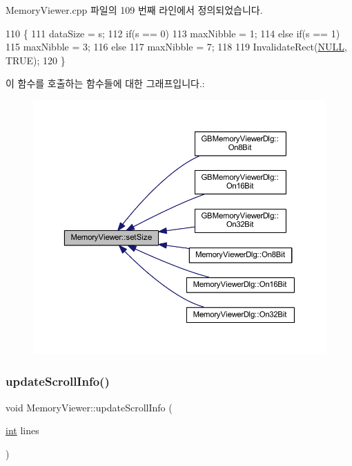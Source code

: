 Memory\+Viewer.\+cpp 파일의 109 번째 라인에서 정의되었습니다.


\begin{DoxyCode}
110 \{
111   dataSize = s;
112   \textcolor{keywordflow}{if}(s == 0)
113     maxNibble = 1;
114   \textcolor{keywordflow}{else} \textcolor{keywordflow}{if}(s == 1)
115     maxNibble = 3;
116   \textcolor{keywordflow}{else}
117     maxNibble = 7;
118   
119   InvalidateRect(\mbox{\hyperlink{getopt1_8c_a070d2ce7b6bb7e5c05602aa8c308d0c4}{NULL}}, TRUE);
120 \}
\end{DoxyCode}
이 함수를 호출하는 함수들에 대한 그래프입니다.\+:
\nopagebreak
\begin{figure}[H]
\begin{center}
\leavevmode
\includegraphics[width=350pt]{class_memory_viewer_a185cb06e604ff1e0016b9be859c21387_icgraph}
\end{center}
\end{figure}
\mbox{\label{class_memory_viewer_aa133e5db4bf989efa18892de371c0f43}} 
\subsubsection{\texorpdfstring{update\+Scroll\+Info()}{updateScrollInfo()}}
{\footnotesize\ttfamily void Memory\+Viewer\+::update\+Scroll\+Info (\begin{DoxyParamCaption}\item[{\mbox{\hyperlink{_util_8cpp_a0ef32aa8672df19503a49fab2d0c8071}{int}}}]{lines }\end{DoxyParamCaption})}



